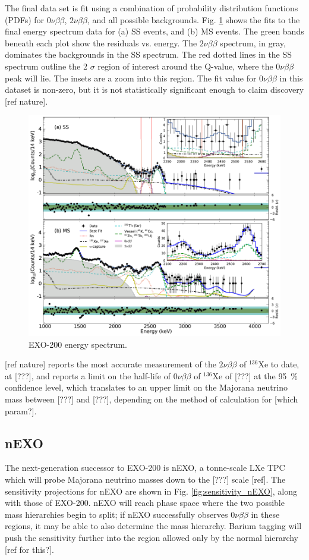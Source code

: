 The final data set is fit using a combination of probability distribution functions (PDFs) for $0\nu\beta\beta$, $2\nu\beta\beta$, and all possible backgrounds.  Fig. \ref{fig:exo200data} shows the fits to the final energy spectrum data for (a) SS events, and (b) MS events.  The green bands beneath each plot show the residuals vs. energy.  The $2\nu\beta\beta$ spectrum, in gray, dominates the backgrounds in the SS spectrum.  The red dotted lines in the SS spectrum outline the {\color{red}2} $\sigma$ region of interest around the Q-value, where the $0\nu\beta\beta$ peak will lie.  The insets are a zoom into this region.  The fit value for $0\nu\beta\beta$ in this dataset is non-zero, but it is not statistically significant enough to claim discovery [ref nature].

\begin{figure}[H]
	\centering
	\includegraphics[width=.7\textwidth]{figures/exo_200_results.png}
	\caption{EXO-200 energy spectrum.  }
\label{fig:exo200data}
\end{figure}

[ref nature] reports the most accurate measurement of the $2\nu\beta\beta$ of $^{136}$Xe to date, at [???], and reports a limit on the half-life of $0\nu\beta\beta$ of $^{136}$Xe of [???] at the {\color{red}95~\%} confidence level, which translates to an upper limit on the Majorana neutrino mass between [???] and [???], depending on the method of calculation for [which param?].

\subsection{nEXO}

The next-generation successor to EXO-200 is nEXO, a tonne-scale LXe TPC which will probe Majorana neutrino masses down to the [???] scale [ref].  The sensitivity projections for nEXO are shown in Fig. \ref{fig:sensitivity_nEXO}, along with those of EXO-200.  nEXO will reach phase space where the two possible mass hierarchies begin to split; if nEXO successfully observes $0\nu\beta\beta$ in these regions, it may be able to also determine the mass hierarchy.  Barium tagging will push the sensitivity further into the region allowed only by the normal hierarchy [ref for this?].

